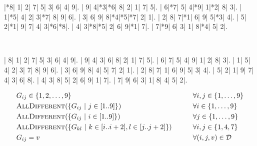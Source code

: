 \documentclass{cons-beamer}
\begin{document}
\begin{frame}[fragile]
  \begin{center}
    \vspace{2mm}
    \PuzzleUnitlength=11pt
    \renewcommand*\SudokuLinethickness{1pt}
    \renewcommand*\PuzzleFont{\sf\tiny}
    \begin{Sudoku}
      |*8| 1| 2| 7| 5| 3| 6| 4| 9|.
      | 9| 4|*3|*6| 8| 2| 1| 7| 5|.
      | 6|*7| 5| 4|*9| 1|*2| 8| 3|.
      | 1|*5| 4| 2| 3|*7| 8| 9| 6|.
      | 3| 6| 9| 8|*4|*5|*7| 2| 1|.
      | 2| 8| 7|*1| 6| 9| 5|*3| 4|.
      | 5| 2|*1| 9| 7| 4| 3|*6|*8|.
      | 4| 3|*8|*5| 2| 6| 9|*1| 7|.
      | 7|*9| 6| 3| 1| 8|*4| 5| 2|.
    \end{Sudoku}
    ~~~~~
    \PuzzleSolution
    \begin{Sudoku}
      | 8| 1| 2| 7| 5| 3| 6| 4| 9|.
      | 9| 4| 3| 6| 8| 2| 1| 7| 5|.
      | 6| 7| 5| 4| 9| 1| 2| 8| 3|.
      | 1| 5| 4| 2| 3| 7| 8| 9| 6|.
      | 3| 6| 9| 8| 4| 5| 7| 2| 1|.
      | 2| 8| 7| 1| 6| 9| 5| 3| 4|.
      | 5| 2| 1| 9| 7| 4| 3| 6| 8|.
      | 4| 3| 8| 5| 2| 6| 9| 1| 7|.
      | 7| 9| 6| 3| 1| 8| 4| 5| 2|.
    \end{Sudoku}
  \end{center}
  \begin{example}
    \footnotesize
    \vspace{-1em}
    \begin{align}
      &G_{ij} \in \{1, 2, \ldots, 9\} & \quad\quad &\forall i, j \in \{1, \ldots, 9\} \\
	    &\textsc{AllDifferent}(\{G_{ij} ~| ~j \in [1..9]\}) & \quad\quad & \forall i \in \{1, \ldots, 9\} \\
	    &\textsc{AllDifferent}(\{G_{ij} ~| ~i \in [1..9]\}) & \quad\quad & \forall j \in \{1, \ldots, 9\} \\
	    &\textsc{AllDifferent}(\{G_{kl} ~| ~k \in [i..i+2],  l \in [j..j+2]\}) & \quad\quad & \forall i,j \in \{1, 4, 7\} \\
      &G_{ij} = v & \quad\quad & \forall (i,j,v) \in {\cal D}
    \end{align}
  \end{example}
\end{frame}
\end{document}
